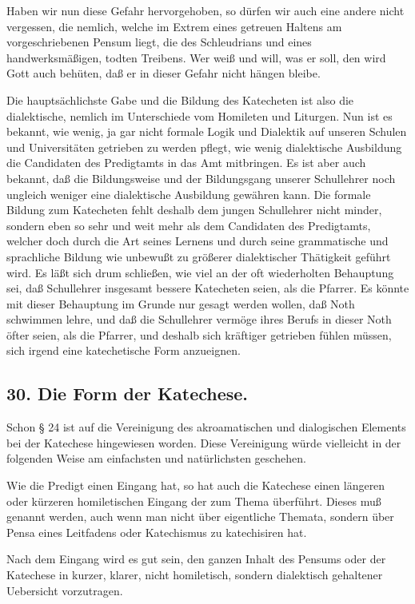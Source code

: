 Haben wir nun diese Gefahr hervorgehoben, so dürfen wir auch eine andere nicht vergessen, die nemlich, welche im Extrem eines getreuen Haltens am vorgeschriebenen Pensum liegt, die des Schleudrians und eines handwerksmäßigen, todten Treibens. Wer weiß und will, was er soll, den wird Gott auch behüten, daß er in dieser Gefahr nicht hängen bleibe.

Die hauptsächlichste Gabe und die Bildung des Katecheten ist also die dialektische, nemlich im Unterschiede vom Homileten und Liturgen. Nun ist es bekannt, wie wenig, ja gar nicht formale Logik und Dialektik auf unseren Schulen und Universitäten getrieben zu werden pflegt, wie wenig dialektische Ausbildung die Candidaten des Predigtamts in das Amt mitbringen. Es ist aber auch bekannt, daß die Bildungsweise und der Bildungsgang unserer Schullehrer noch ungleich weniger eine dialektische Ausbildung gewähren kann. Die formale Bildung zum Katecheten fehlt deshalb dem
jungen Schullehrer nicht minder, sondern eben so sehr und weit mehr als dem Candidaten des Predigtamts, welcher doch durch die Art seines Lernens und durch seine grammatische und sprachliche Bildung wie unbewußt zu größerer dialektischer Thätigkeit geführt wird. Es läßt sich drum schließen, wie viel an der oft wiederholten Behauptung sei, daß Schullehrer insgesamt bessere Katecheten seien, als die Pfarrer. Es könnte mit dieser Behauptung im Grunde nur gesagt werden wollen, daß Noth schwimmen lehre, und daß die Schullehrer vermöge ihres Berufs in dieser Noth öfter seien, als die Pfarrer, und deshalb sich kräftiger getrieben fühlen müssen, sich irgend eine katechetische Form anzueignen.

\subsection*{30. Die Form der Katechese.}

Schon § 24 ist auf die Vereinigung des akroamatischen und dialogischen Elements bei der Katechese hingewiesen worden. Diese Vereinigung würde vielleicht in der folgenden Weise am einfachsten und natürlichsten geschehen.

Wie die Predigt einen Eingang hat, so hat auch die Katechese einen längeren oder kürzeren homiletischen Eingang der zum Thema überführt. Dieses muß genannt werden, auch wenn man nicht über eigentliche Themata, sondern über Pensa eines Leitfadens oder Katechismus zu katechisiren hat.

Nach dem Eingang wird es gut sein, den ganzen Inhalt des Pensums oder der Katechese in kurzer, klarer, nicht homiletisch, sondern dialektisch gehaltener Uebersicht vorzutragen.

